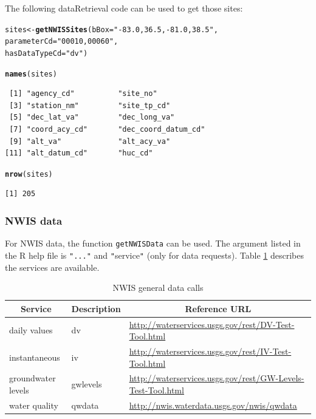 \documentclass[a4paper,11pt]{article}\usepackage[]{graphicx}\usepackage[]{color}
\makeatletter
\newcommand{\hlstr}[1]{\textcolor[rgb]{0.192,0.494,0.8}{#1}}%
\newcommand{\hlstd}[1]{\textcolor[rgb]{0.345,0.345,0.345}{#1}}%
\newcommand{\hlkwb}[1]{\textcolor[rgb]{0.69,0.353,0.396}{#1}}%
\newcommand{\hlkwc}[1]{\textcolor[rgb]{0.333,0.667,0.333}{#1}}%
\newcommand{\hlkwd}[1]{\textcolor[rgb]{0.737,0.353,0.396}{\textbf{#1}}}%
\newenvironment{kframe}{%
 \def\at@end@of@kframe{}%
 \ifinner\ifhmode%
  \def\at@end@of@kframe{\end{minipage}}%
  \begin{minipage}{\columnwidth}%
 \fi\fi%
 \def\FrameCommand##1{\hskip\@totalleftmargin \hskip-\fboxsep
 \colorbox{shadecolor}{##1}\hskip-\fboxsep
     \hskip-\linewidth \hskip-\@totalleftmargin \hskip\columnwidth}%
 \MakeFramed {\advance\hsize-\width
   \@totalleftmargin\z@ \linewidth\hsize
   \@setminipage}}%
 {\par\unskip\endMakeFramed%
 \at@end@of@kframe}
\newenvironment{knitrout}{}{} %
\makeatother
\begin{document}
The following dataRetrieval code can be used to get those sites:

\begin{knitrout}
\color{fgcolor}\begin{kframe}
\begin{alltt}
\hlstd{sites} \hlkwb{<-} \hlkwd{getNWISSites}\hlstd{(}\hlkwc{bBox}\hlstd{=}\hlstr{"-83.0,36.5,-81.0,38.5"}\hlstd{,}
                      \hlkwc{parameterCd}\hlstd{=}\hlstr{"00010,00060"}\hlstd{,}
                      \hlkwc{hasDataTypeCd}\hlstd{=}\hlstr{"dv"}\hlstd{)}

\hlkwd{names}\hlstd{(sites)}
\end{alltt}
\begin{verbatim}
 [1] "agency_cd"          "site_no"           
 [3] "station_nm"         "site_tp_cd"        
 [5] "dec_lat_va"         "dec_long_va"       
 [7] "coord_acy_cd"       "dec_coord_datum_cd"
 [9] "alt_va"             "alt_acy_va"        
[11] "alt_datum_cd"       "huc_cd"            
\end{verbatim}
\begin{alltt}
\hlkwd{nrow}\hlstd{(sites)}
\end{alltt}
\begin{verbatim}
[1] 205
\end{verbatim}
\end{kframe}
\end{knitrout}


\subsubsection{NWIS data}
\label{sec:NWISGenData}
For NWIS data, the function \texttt{getNWISData} can be used. The argument listed in the R help file is \texttt{"..."} and \texttt{"}service\texttt{"} (only for data requests). Table \ref{tab:NWISGeneral} describes the services are available.

\begin{table}[!ht]
\begin{minipage}{\linewidth}
{\footnotesize
\caption{NWIS general data calls} 
\label{tab:NWISGeneral}
\begin{tabular}{lll}
  \hline
\multicolumn{1}{c}{\textbf{\textsf{Service}}} &
\multicolumn{1}{c}{\textbf{\textsf{Description}}}  &
\multicolumn{1}{c}{\textbf{\textsf{Reference URL}}} \\  [0pt]
  \hline
  daily values &  dv & \url{http://waterservices.usgs.gov/rest/DV-Test-Tool.html}\\
  [5pt]instantaneous & iv & \url{http://waterservices.usgs.gov/rest/IV-Test-Tool.html}\\
  [5pt]groundwater levels & gwlevels & \url{http://waterservices.usgs.gov/rest/GW-Levels-Test-Tool.html}\\
  [5pt]water quality & qwdata & \url{http://nwis.waterdata.usgs.gov/nwis/qwdata}\\
   \hline
\end{tabular}
}
\end{minipage}
\end{table}
\end{document}
